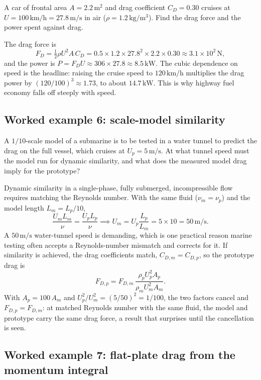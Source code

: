 A car of frontal area $A = 2.2\,\si{\meter}^2$ and drag coefficient
$C_D = 0.30$ cruises at $U = 100\,\text{km/h} = 27.8\,\si{\meter\per
\second}$ in air ($\rho = 1.2\,\si{\kilogram\per\meter\cubed}$).
Find the drag force and the power spent against drag.

The drag force is
\[
F_D = \tfrac12\rho U^2 A\,C_D = 0.5\times1.2\times27.8^2\times2.2
\times0.30 \approx 3.1\times10^{2}\,\si{\newton},
\]
and the power is $P = F_D U \approx 306\times27.8 \approx 8.5\,\text{
kW}$. The cubic dependence on speed is the headline: raising the
cruise speed to $120\,\text{km/h}$ multiplies the drag power by
$(120/100)^3 \approx 1.73$, to about $14.7\,\text{kW}$. This is why
highway fuel economy falls off steeply with speed.

\subsection*{Worked example 6: scale-model similarity}

A $1/10$-scale model of a submarine is to be tested in a water tunnel
to predict the drag on the full vessel, which cruises at $U_p =
5\,\si{\meter\per\second}$. At what tunnel speed must the model run
for dynamic similarity, and what does the measured model drag imply
for the prototype?

Dynamic similarity in a single-phase, fully submerged, incompressible
flow requires matching the Reynolds number. With the same fluid
($\nu_m = \nu_p$) and the model length $L_m = L_p/10$,
\[
\frac{U_m L_m}{\nu} = \frac{U_p L_p}{\nu} \implies U_m = U_p
\frac{L_p}{L_m} = 5\times10 = 50\,\si{\meter\per\second}.
\]
A $50\,\si{\meter\per\second}$ water-tunnel speed is demanding, which
is one practical reason marine testing often accepts a Reynolds-number
mismatch and corrects for it. If similarity is achieved, the drag
coefficients match, $C_{D,m} = C_{D,p}$, so the prototype drag is
\[
F_{D,p} = F_{D,m}\,\frac{\rho_p U_p^2 A_p}{\rho_m U_m^2 A_m}.
\]
With $A_p = 100\,A_m$ and $U_p^2/U_m^2 = (5/50)^2 = 1/100$, the two
factors cancel and $F_{D,p} = F_{D,m}$: at matched Reynolds number
with the same fluid, the model and prototype carry the same drag
force, a result that surprises until the cancellation is seen.

\subsection*{Worked example 7: flat-plate drag from the momentum integral}

